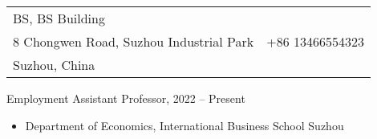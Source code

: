 \documentclass{resume_liang} %
\begin{document}
	
\begin{tabu} to \linewidth {X[l]X[r]}
BS, BS Building  & \href{mailto:lfu@albany.edu}{\color{blue}{lfu@albany.edu}} \\
8 Chongwen Road, Suzhou Industrial Park     & +86 13466554323 \\
Suzhou, China           & \href{https://liang-fu-econ.github.io/website/}{\color{blue}{https://liang-fu-econ.github.io/website/}}
\end{tabu}
\bigskip





\begin{rSection}{Employment}
Assistant Professor, {\bf \href{https://www.xjtlu.edu.cn/en/study/departments/academic-departments/economics/}{\color{black}{Xi'an Jiaotong-Liverpool University}}}  \hfill {2022 -- Present}  
\begin{itemize}
	\item[] Department of Economics, International Business School Suzhou
\end{itemize}   
\vspace{0.3cm}          
\end{rSection}
\bigskip  
\end{document}
